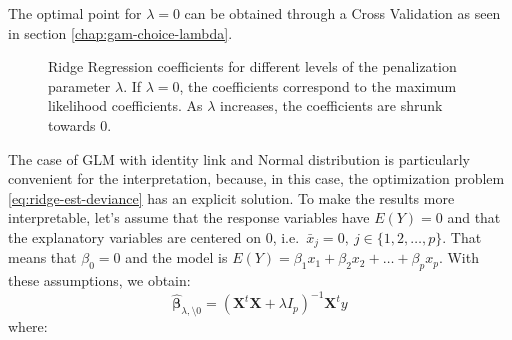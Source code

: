 \documentclass[a4paper, nobind]{templates/ociamthesis}
\theoremstyle{definition}
\theoremstyle{definition}
\theoremstyle{definition}
\theoremstyle{remark}
\begin{document}
The optimal point for \(\lambda=0\) can be obtained through a Cross Validation as seen in section \ref{chap:gam-choice-lambda}.







\begin{figure}[!hbtp]

{\centering {}\newline{}\newline{}

}

\caption[The Bias-Variance trade off. Ridge Regression coefficients for different levels of the penalization parameter \(\lambda\).]{Ridge Regression coefficients for different levels of the penalization parameter \(\lambda\). If \(\lambda=0\), the coefficients correspond to the maximum likelihood coefficients. As \(\lambda\) increases, the coefficients are shrunk towards \(0\).}\label{fig:ridge-lambda}
\end{figure}

The case of GLM with identity link and Normal distribution is particularly convenient for the interpretation, because, in this case, the optimization problem \eqref{eq:ridge-est-deviance} has an explicit solution. To make the results more interpretable, let's assume that the response variables have \(E(Y)=0\) and that the explanatory variables are centered on \(0\), i.e.~\(\bar{x}_j=0, \ j\in\{1,2,\dots,p\}\). That means that \(\beta_0=0\) and the model is \(E(Y)=\beta_1x_1+\beta_2x_2+\dots+\beta_px_p\). With these assumptions, we obtain:
\begin{equation}
\label{eq:ridge-estimator}
\hat{\boldsymbol{\beta}}_{\lambda,\setminus0} = \left(\boldsymbol{X}^t\boldsymbol{X}+\lambda I_p\right)^{-1}\boldsymbol{X}^t y
\end{equation}
where:
\end{document}
